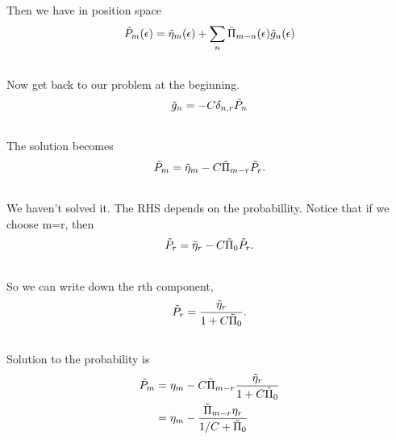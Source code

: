 \documentclass[letterpaper,10pt,english]{sphinxmanual}
\begin{document}
Then we have in position space
\begin{gather}
\begin{split}\tilde P_m(\epsilon) = \tilde \eta_m(\epsilon)  + \sum_n \tilde \Pi_{m-n}(\epsilon) \tilde g_n(\epsilon)\end{split}\notag\\\begin{split}\end{split}\notag
\end{gather}
Now get back to our problem at the beginning.
\begin{gather}
\begin{split}\tilde g_n = - C\delta _{n,r} \tilde P_n\end{split}\notag\\\begin{split}\end{split}\notag
\end{gather}
The solution becomes
\begin{gather}
\begin{split}\tilde P_m = \tilde \eta _m - C \tilde \Pi_{m-r} \tilde P_r .\end{split}\notag\\\begin{split}\end{split}\notag
\end{gather}
We haven't solved it. The RHS depends on the probabillity. Notice that if we choose m=r, then
\begin{gather}
\begin{split}\tilde P_r  = \tilde \eta_r - C\tilde \Pi_0 \tilde P_r .\end{split}\notag\\\begin{split}\end{split}\notag
\end{gather}
So we can write down the rth component,
\begin{gather}
\begin{split}\tilde P_r = \frac{\tilde \eta_r}{1+C\tilde \Pi_0}  .\end{split}\notag\\\begin{split}\end{split}\notag
\end{gather}
Solution to the probability is
\begin{gather}
\begin{split}\tilde P_m &= \eta_m - C\tilde \Pi_{m-r}  \frac{\tilde \eta_r}{1+C\tilde \Pi_0} \\
& = \eta_m - \frac{\tilde \Pi_{m-r} \eta_r}{1/C + \tilde \Pi_0}\end{split}\notag\\\begin{split}\end{split}\notag
\end{gather}
\end{document}
